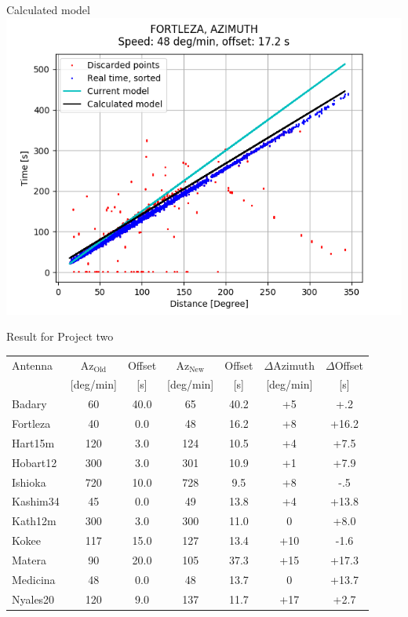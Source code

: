 \documentclass{beamer}
\begin{document}
    \begin{frame}{Calculated model}
        \centering
        \includegraphics[width=1\columnwidth]{FORTLEZA_AZIMUTH}
    \end{frame}
    \begin{frame}{Result for Project two}
        \tabcolsep=0.15cm
        \begin{tabular}{l | c c | c c |c c}
            Antenna & $\text{Az}_{\text{Old}}$ & Offset & $\text{Az}_{\text{New}}$ & Offset & $\Delta$Azimuth & $\Delta$Offset \\ [-8pt]
                    & \tiny{[deg/min]}& \tiny{[s]}&\tiny{[deg/min]}&\tiny{[s]}&\tiny{[deg/min]}& \tiny{[s]} \\ 
            \hline
            Badary            & 60  & 40.0  & 65  & 40.2 &  +5 &  +.2 \\
            Fortleza          & 40  &  0.0  & 48  & 16.2 &  +8 &+16.2 \\
            Hart15m           & 120 &  3.0  & 124 & 10.5 &  +4 & +7.5 \\
            Hobart12          & 300 &  3.0  & 301 & 10.9 &  +1 & +7.9 \\
            Ishioka           & 720 & 10.0  & 728 &  9.5 &  +8 &  -.5 \\
            Kashim34          & 45  &  0.0  & 49  & 13.8 &  +4 &+13.8 \\
            Kath12m           & 300 &  3.0  & 300 & 11.0 &   0 & +8.0 \\
            Kokee             & 117 & 15.0  & 127 & 13.4 & +10 & -1.6 \\
            Matera            & 90  & 20.0  & 105 & 37.3 & +15 &+17.3 \\
            Medicina          &  48 &  0.0  & 48  & 13.7 &   0 &+13.7 \\
            Nyales20          & 120 &  9.0  & 137 & 11.7 & +17 & +2.7 \\
        \end{tabular}
    \end{frame}
\end{document}
